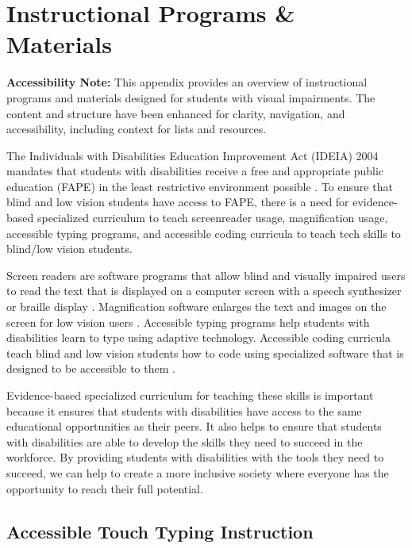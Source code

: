 \chapter{Instructional Programs \& Materials}\label{appx4}

\noindent
\textbf{Accessibility Note:} This appendix provides an overview of instructional programs and materials designed for students with visual impairments. The content and structure have been enhanced for clarity, navigation, and accessibility, including context for lists and resources.

The Individuals with Disabilities Education Improvement Act (IDEIA) 2004 mandates that students with disabilities receive a free and appropriate public education (FAPE) in the least restrictive environment possible \cite{IDEA2004}. To ensure that blind and low vision students have access to FAPE, there is a need for evidence-based specialized curriculum to teach screenreader usage, magnification usage, accessible typing programs, and accessible coding curricula to teach tech skills to blind/low vision students.

Screen readers are software programs that allow blind and visually impaired users to read the text that is displayed on a computer screen with a speech synthesizer or braille display \cite{PathsToLiteracy}. Magnification software enlarges the text and images on the screen for low vision users \cite{AFBMagnification}. Accessible typing programs help students with disabilities learn to type using adaptive technology. Accessible coding curricula teach blind and low vision students how to code using specialized software that is designed to be accessible to them \cite{FreeCodeCamp2018}.

Evidence-based specialized curriculum for teaching these skills is important because it ensures that students with disabilities have access to the same educational opportunities as their peers. It also helps to ensure that students with disabilities are able to develop the skills they need to succeed in the workforce. By providing students with disabilities with the tools they need to succeed, we can help to create a more inclusive society where everyone has the opportunity to reach their full potential.

\section{Accessible Touch Typing Instruction}\label{appx5}

